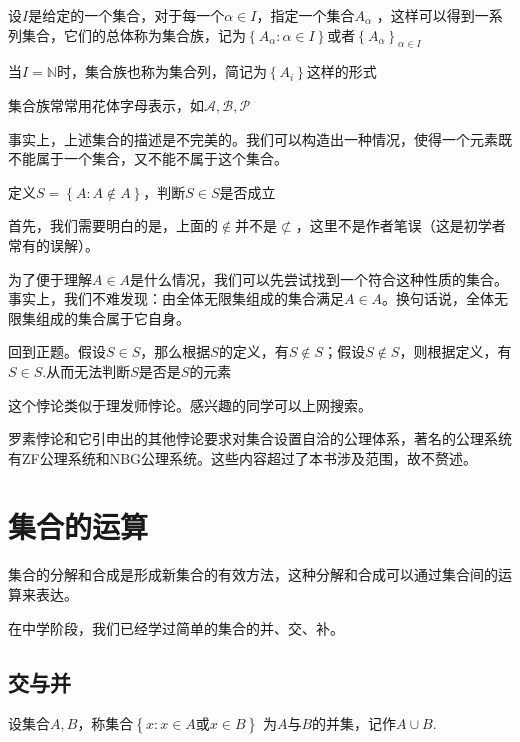 \begin{definition}[集合族]
    设$I$是给定的一个集合，对于每一个$\alpha \in I$，指定一个集合$A_\alpha$ ，这样可以得到一系列集合，它们的总体称为集合族，记为$\left\{A_\alpha : \alpha \in I \right\}$或者$\left\{A_\alpha \right\}_{\alpha \in I}$

    当$I=\mathbb{N}$时，集合族也称为集合列，简记为$\left\{A_i \right\}$这样的形式

    集合族常常用花体字母表示，如$\mathcal{A},\mathcal{B} ,\mathcal{P} $ 
\end{definition}

事实上，上述集合的描述是不完美的。我们可以构造出一种情况，使得一个元素既不能属于一个集合，又不能不属于这个集合。

\begin{example}[罗素悖论]
    定义$S=\left\{A:A\notin A \right\}$，判断$S\in S$是否成立
\end{example}

首先，我们需要明白的是，上面的$\notin$并不是$\nsubset$，这里不是作者笔误（这是初学者常有的误解）。

为了便于理解$A \in A$是什么情况，我们可以先尝试找到一个符合这种性质的集合。事实上，我们不难发现：由全体无限集组成的集合满足$A\in A$。换句话说，全体无限集组成的集合属于它自身。

回到正题。假设$S\in S$，那么根据$S$的定义，有$S \notin S$；假设$S \notin S$，则根据定义，有$S \in S$.从而无法判断$S$是否是$S$的元素

这个悖论类似于理发师悖论。感兴趣的同学可以上网搜索。

罗素悖论和它引申出的其他悖论要求对集合设置自洽的公理体系，著名的公理系统有ZF公理系统和NBG公理系统。这些内容超过了本书涉及范围，故不赘述。

\section{集合的运算}

集合的分解和合成是形成新集合的有效方法，这种分解和合成可以通过集合间的运算来表达。

在中学阶段，我们已经学过简单的集合的并、交、补。

\subsection*{交与并}

\begin{definition}
    设集合$A,B$，称集合$\left\{x: x\in A \text{或} x \in B \right\}$ 为$A$与$B$的并集，记作$A \cup B$.
\end{definition}

